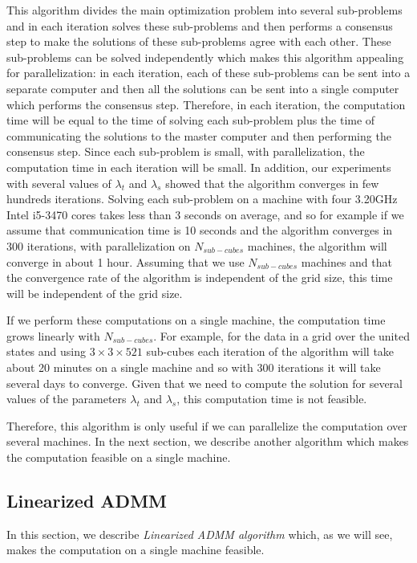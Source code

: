 \documentclass[review]{elsarticle}
\begin{document}
This algorithm divides the main optimization problem into several sub-problems and in each iteration solves these sub-problems and then performs a consensus step to make the solutions of these sub-problems agree with each other. These sub-problems can be solved independently which makes this algorithm appealing for parallelization: in each iteration, each of these sub-problems can be sent into a separate computer and then all the solutions can be sent into a single computer which performs the consensus step. Therefore, in each iteration, the computation time will be equal to the time of solving each sub-problem plus the time of communicating the solutions to the master computer and then performing the consensus step. Since each sub-problem is small, with parallelization, the computation time in each iteration will be small. In addition, our experiments with several values of $\lambda_t$ and $\lambda_s$ showed that the algorithm converges in few hundreds iterations. Solving each sub-problem on a machine with four 3.20GHz Intel i5-3470 cores takes less than 3 seconds on average, and so for example if we assume that communication time is 10 seconds and the algorithm converges in 300 iterations, with parallelization on $N_{sub-cubes}$ machines, the algorithm will converge in about 1 hour. Assuming that we use $N_{sub-cubes}$ machines and that the convergence rate of the algorithm is independent of the grid size, this time will be independent of the grid size.

If we perform these computations on a single machine, the computation time grows linearly with $N_{sub-cubes}$. For example, for the data in a grid over the united states and using $3\times3\times521$ sub-cubes each iteration of the algorithm will take about 20 minutes on a single machine and so with 300 iterations it will take several days to converge. Given that we need to compute the solution for several values of the parameters $\lambda_t$ and $\lambda_s$, this computation time is not feasible.

Therefore, this algorithm is only useful if we can parallelize the computation over several machines. In the next section, we describe another algorithm which makes the computation feasible on a single machine.

\subsection{Linearized ADMM}
\label{sec:linADMM}

In this section, we describe \textit{Linearized ADMM algorithm} \cite{parikh_proximal_2014} which, as we will see, makes the computation on a single machine feasible.
\end{document}
